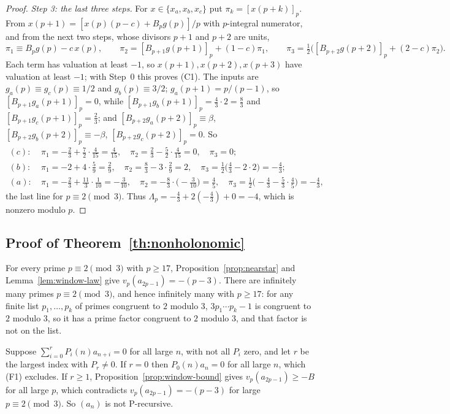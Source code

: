 \documentclass[11pt]{article}
\theoremstyle{remark}
\newcommand{\res}[1]{[#1]_p}
\begin{document}
\begin{proof}
\emph{Step 3: the last three steps.} For $x\in\{x_a,x_b,x_c\}$ put $\pi_k=\res{x(p+k)}$. From $x(p+1)=[x(p)(p-c)+B_pg(p)]/p$ with $p$-integral numerator, and from the next two steps, whose divisors $p+1$ and $p+2$ are units,
\[
 \pi_1\equiv B_pg(p)-c\,x(p),\qquad
 \pi_2=\res{B_{p+1}g(p+1)}+(1-c)\pi_1,\qquad
 \pi_3=\tfrac12\bigl(\res{B_{p+2}g(p+2)}+(2-c)\pi_2\bigr).
\]
Each term has valuation at least $-1$, so $x(p+1),x(p+2),x(p+3)$ have valuation at least $-1$; with Step~0 this proves (C1). The inputs are $g_a(p)\equiv g_c(p)\equiv1/2$ and $g_b(p)\equiv3/2$; $g_a(p+1)=p/(p-1)$, so $\res{B_{p+1}g_a(p+1)}=0$, while $\res{B_{p+1}g_b(p+1)}=\frac43\cdot2=\frac83$ and $\res{B_{p+1}g_c(p+1)}=\frac23$; and $\res{B_{p+2}g_a(p+2)}\equiv\beta$, $\res{B_{p+2}g_b(p+2)}\equiv-\beta$, $\res{B_{p+2}g_c(p+2)}=0$. So
\begin{align*}
 (c):\ &\pi_1=-\tfrac23+\tfrac72\cdot\tfrac4{15}=\tfrac4{15},\quad \pi_2=\tfrac23-\tfrac52\cdot\tfrac4{15}=0,\quad \pi_3=0;\\
 (b):\ &\pi_1=-2+4\cdot\tfrac59=\tfrac29,\quad \pi_2=\tfrac83-3\cdot\tfrac29=2,\quad \pi_3=\tfrac12\bigl(\tfrac43-2\cdot2\bigr)=-\tfrac43;\\
 (a):\ &\pi_1=-\tfrac23+\tfrac{11}3\cdot\tfrac1{10}=-\tfrac3{10},\quad \pi_2=-\tfrac83\cdot\bigl(-\tfrac3{10}\bigr)=\tfrac45,\quad \pi_3=\tfrac12\bigl(-\tfrac43-\tfrac53\cdot\tfrac45\bigr)=-\tfrac43,
\end{align*}
the last line for $p\equiv2\pmod3$. Thus $\Lambda_p=-\frac43+2(-\frac43)+0=-4$, which is nonzero modulo $p$.
\end{proof}

\subsection{Proof of Theorem~\ref{th:nonholonomic}}
For every prime $p\equiv2\pmod3$ with $p\ge17$, Proposition~\ref{prop:nearstar} and Lemma~\ref{lem:window-law} give $v_p(a_{2p-1})=-(p-3)$. There are infinitely many primes $p\equiv2\pmod3$, and hence infinitely many with $p\ge17$: for any finite list $p_1,\dots,p_k$ of primes congruent to $2$ modulo $3$, $3p_1\cdots p_k-1$ is congruent to $2$ modulo $3$, so it has a prime factor congruent to $2$ modulo $3$, and that factor is not on the list.

Suppose $\sum_{i=0}^rP_i(n)a_{n+i}=0$ for all large $n$, with not all $P_i$ zero, and let $r$ be the largest index with $P_r\ne0$. If $r=0$ then $P_0(n)a_n=0$ for all large $n$, which (F1) excludes. If $r\ge1$, Proposition~\ref{prop:window-bound} gives $v_p(a_{2p-1})\ge-B$ for all large $p$, which contradicts $v_p(a_{2p-1})=-(p-3)$ for large $p\equiv2\pmod3$. So $(a_n)$ is not P-recursive.
\end{document}
